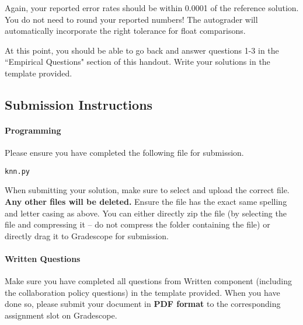 \documentclass[11pt,addpoints,answers]{exam}
\begin{document}
Again, your reported error rates should be within 0.0001 of the reference solution. You do not need to round your reported numbers! The autograder will automatically incorporate the right tolerance for float comparisons.

\begin{notebox}
At this point, you should be able to go back and answer questions 1-3 in the ``Empirical Questions" section of this handout.  Write your solutions in the template provided. \end{notebox}
    
\subsection{Submission Instructions}

\paragraph{Programming}
Please ensure you have completed the following file for submission.

\begin{verbatim}
knn.py
\end{verbatim}

When submitting your solution, make sure to select and upload the correct file. \textbf{Any other files will be deleted.} Ensure the file has the exact same spelling and letter casing as above. You can either directly zip the file (by selecting the file and compressing it -- do not compress the folder containing the file) or directly drag it to Gradescope for submission.

\paragraph{Written Questions}
Make sure you have completed all questions from Written component (including the collaboration policy questions) in the template provided.  When you have done so, please submit your document in \textbf{PDF format} to the corresponding assignment slot on Gradescope.\newpage
\end{document}
